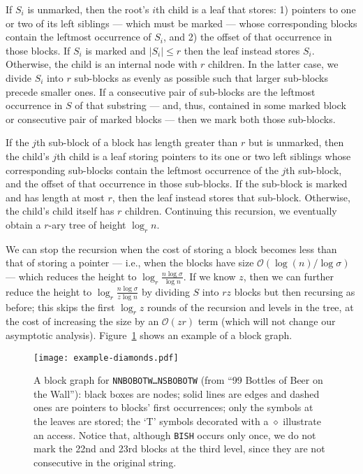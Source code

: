 \documentclass[12pt]{article}
\newcommand{\Oh}[1]
  {\ensuremath{\mathcal{O}\!\left({#1}\right)}}
\begin{document}
If $S_i$ is unmarked, then the root's $i$th child is a leaf that stores: 1) pointers to one or two of its left siblings --- which must be marked --- whose corresponding blocks contain the leftmost occurrence of $S_i$, and 2) the offset of that occurrence in those blocks.  If $S_i$ is marked and \(|S_i| \leq r\) then the leaf instead stores $S_i$.  Otherwise, the child is an internal node with $r$ children.  In the latter case, we divide $S_i$ into $r$ sub-blocks as evenly as possible such that larger sub-blocks precede smaller ones.  If a consecutive pair of sub-blocks are the leftmost occurrence in $S$ of that substring --- and, thus, contained in some marked block or consecutive pair of marked blocks --- then we mark both those sub-blocks.

If the $j$th sub-block of a block has length greater than $r$ but is unmarked, then the child's $j$th child is a leaf storing pointers to its one or two left siblings whose corresponding sub-blocks contain the leftmost occurrence of the $j$th sub-block, and the offset of that occurrence in those sub-blocks.  If the sub-block is marked and has length at most $r$, then the leaf instead stores that sub-block.  Otherwise, the child's child itself has $r$ children.  Continuing this recursion, we eventually obtain a $r$-ary tree of height $\log_r n$.

We can stop the recursion when the cost of storing a block becomes less than that of storing a pointer --- i.e., when the blocks have size $\Oh{\log (n) / \log \sigma}$ --- which reduces the height to $\log_r \frac{n \log \sigma}{\log n}$.  If we know $z$, then we can further reduce the height to $\log_r \frac{n \log \sigma}{z \log n}$ by dividing $S$ into \(r z\) blocks but then recursing as before; this skips the first \(\log_r z\) rounds of the recursion and levels in the tree, at the cost of increasing the size by an $\Oh{z r}$ term (which will not change our asymptotic analysis).  Figure~\ref{fig:graph} shows an example of a block graph.

\begin{figure}[t]
\texttt{[image: example-diamonds.pdf]}
\caption{A block graph for {\tt NNBOBOTW\dots NSBOBOTW} (from ``99 Bottles of Beer on the Wall''): black boxes are nodes; solid lines are edges and dashed ones are pointers to blocks' first occurrences; only the symbols at the leaves are stored; the `{\sf T}' symbols decorated with a $\diamond$ illustrate an access.  Notice that, although {\tt BISH} occurs only once, we do not mark the 22nd and 23rd blocks at the third level, since they are not consecutive in the original string.}
\label{fig:graph}
\end{figure}
\end{document}
